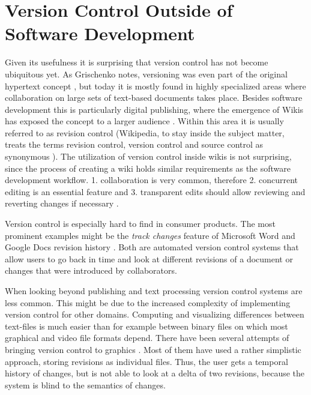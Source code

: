 \section{Version Control Outside of Software Development}
Given its usefulness it is surprising that version control has not become ubiquitous yet. As Grischenko notes, versioning was even part of the original hypertext concept \cite{grishchenko_deep_2010}, but today it is mostly found in highly specialized areas where collaboration on large sets of text-based documents takes place. Besides software development this is particularly digital publishing, where the emergence of Wikis has exposed the concept to a larger audience \cite{priedhorsky_wiki_2011}. Within this area it is usually referred to as revision control (Wikipedia, to stay inside the subject matter, treats the terms revision control, version control and source control as synonymous \cite{_revision_2015}). The utilization of version control inside wikis is not surprising, since the process of creating a wiki holds similar requirements as the software development workflow. 1. collaboration is very common, therefore 2. concurrent editing is an essential feature and 3. transparent edits should allow reviewing and reverting changes if necessary \cite{priedhorsky_wiki_2011}. %

Version control is especially hard to find in consumer products. The most prominent examples might be the \textit{track changes} feature of Microsoft Word \cite{_track_2015} and Google Docs revision history \cite{_see_2015}. Both are automated version control systems that allow users to go back in time and look at different revisions of a document or changes that were introduced by collaborators.

When looking beyond publishing and text processing version control systems are less common. This might be due to the increased complexity of implementing version control for other domains. Computing and visualizing differences between text-files is much easier than for example between binary files on which most graphical and video file formats depend.  There have been several attempts of bringing version control to graphics \cite{nack_new_2009,_adobe_????,_introducing_????}. Most of them have used a rather simplistic approach, storing revisions as individual files. Thus, the user gets a temporal history of changes, but is not able to look at a delta of two revisions, because the system is blind to the semantics of changes.

